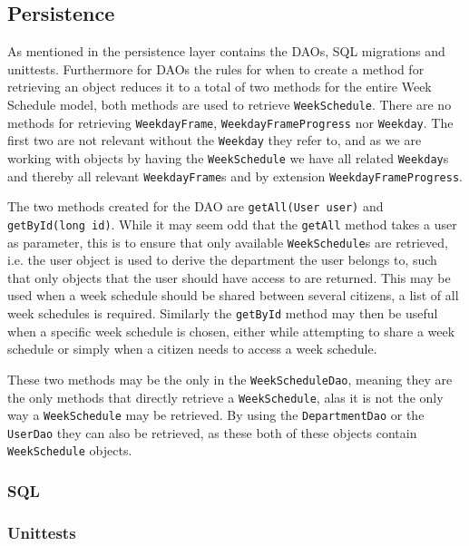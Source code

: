 \subsection{Persistence}
As mentioned in  the persistence layer contains the DAOs, SQL migrations and unittests.%
Furthermore for DAOs the rules for when to create a method for retrieving an object reduces it to a total of two methods for the entire Week Schedule model, both methods are used to retrieve \texttt{WeekSchedule}.
There are no methods for retrieving \texttt{WeekdayFrame}, \texttt{WeekdayFrameProgress} nor \texttt{Weekday}.
The first two are not relevant without the \texttt{Weekday} they refer to, and as we are working with objects by having the \texttt{WeekSchedule} we have all related \texttt{Weekday}s and thereby all relevant \texttt{WeekdayFrame}s and by extension \texttt{WeekdayFrameProgress}.

The two methods created for the DAO are \texttt{getAll(User user)} and \texttt{getById(long id)}.
While it may seem odd that the \texttt{getAll} method takes a user as parameter, this is to ensure that only available \texttt{WeekSchedule}s are retrieved, i.e. the user object is used to derive the department the user belongs to, such that only objects that the user should have access to are returned.
This may be used when a week schedule should be shared between several citizens, a list of all week schedules is required.
Similarly the \texttt{getById} method may then be useful when a specific week schedule is chosen, either while attempting to share a week schedule or simply when a citizen needs to access a week schedule.

These two methods may be the only in the \texttt{WeekScheduleDao}, meaning they are the only methods that directly retrieve a \texttt{WeekSchedule}, alas it is not the only way a \texttt{WeekSchedule} may be retrieved.
By using the \texttt{DepartmentDao} or the \texttt{UserDao} they can also be retrieved, as these both of these objects contain \texttt{WeekSchedule} objects.

\subsubsection{SQL}
\subsubsection{Unittests}

